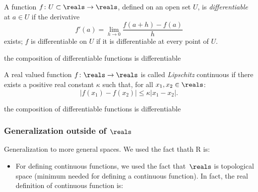 {    

    \begin{definition}
        A function $f\colon U\subset \reals\to \reals$, defined on an open set $U$, is \emph{differentiable} at $a\in U$ if the derivative
        \begin{equation}
            f'(a)=\lim_{h\to 0} \frac{f(a+h)-f(a)}{h}
        \end{equation}
        exists; $f$ is differentiable on $U$ if it is differentiable at every point of $U$.
    \end{definition}

    \begin{example}
        the composition of differentiable functions is differentiable
    \end{example}


    \begin{definition}
        A real valued function $f\colon \reals\to \reals$ is called \emph{Lipschitz} continuous if there exists a positive real constant $\kappa$ such that, for all $x_1,x_2\in \reals$:
        \begin{equation}
            \vert f(x_1)-f(x_2)\vert \leq \kappa \vert x_1-x_2\vert.
        \end{equation}
    \end{definition}

    \begin{example}
        the composition of differentiable functions is differentiable
    \end{example}


    \subsubsection{Generalization outside of $\reals$}
    Generalization to more general spaces.
    We used the fact thath R is:
    \begin{itemize}
        \item For defining continuous functions, we used the fact that~$\reals$ is topological space (minimum needed for defining a continuous function).
              In fact, the real definition of continuous function is:


\end{itemize}}
